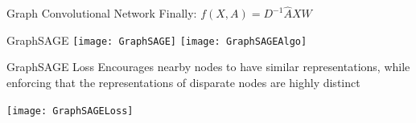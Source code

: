 \begin{frame}[t]{Graph Convolutional Network}
    Finally: $f(X, A) = D^{-1} \hat{A} X W$

    
\end{frame}

\begin{frame}[t]{GraphSAGE}
    \texttt{[image: GraphSAGE]}
    \texttt{[image: GraphSAGEAlgo]}
\end{frame}

\begin{frame}[t]{GraphSAGE Loss}
    Encourages nearby nodes to have similar representations, while enforcing
    that the representations of disparate nodes are highly distinct

    \texttt{[image: GraphSAGELoss]}
\end{frame}
